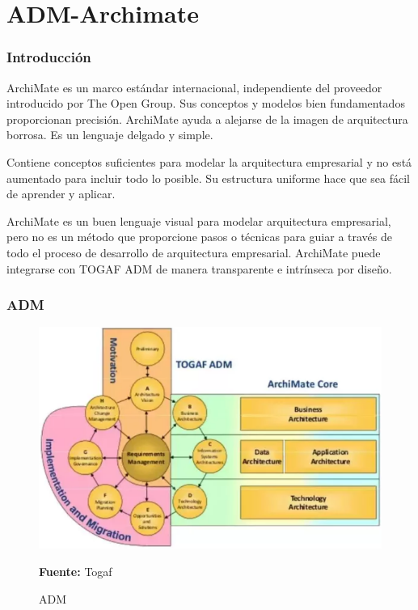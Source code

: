 \section{ADM-Archimate}
\subsubsection{Introducción}

ArchiMate es un marco estándar internacional, independiente del proveedor introducido por The Open Group. Sus conceptos y modelos bien fundamentados proporcionan precisión. ArchiMate ayuda a alejarse de la imagen de arquitectura borrosa. Es un lenguaje delgado y simple. 

\vspace{0.5cm}

Contiene conceptos suficientes para modelar la arquitectura empresarial y no está aumentado para incluir todo lo posible. Su estructura uniforme hace que sea fácil de aprender y aplicar.

\vspace{0.5cm}

ArchiMate es un buen lenguaje visual para modelar arquitectura empresarial, pero no es un método que proporcione pasos o técnicas para guiar a través de todo el proceso de desarrollo de arquitectura empresarial. ArchiMate puede integrarse con TOGAF ADM de manera transparente e intrínseca por diseño.

\subsubsection{ADM}

\begin{figure}[th!]
	\centering
	\includegraphics[width=0.7\linewidth]{arquitectura/adm_lenguaje/imgs/adm}
	\caption{ADM} {\scriptsize \textbf{Fuente:} Togaf \cite{WEB8} \cite{LTogaf}}	
	\label{fig:adm}
\end{figure}

